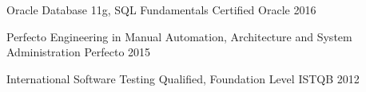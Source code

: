 

\begin{cvhonors}

  \cvhonor
    {Oracle Database 11g, SQL Fundamentals Certified} %
    {Oracle} %
    {} %
    {2016} %

  \cvhonor
    {Perfecto Engineering in Manual Automation, Architecture and System Administration} %
    {Perfecto} %
    {} %
    {2015} %

  \cvhonor
    {International Software Testing Qualified, Foundation Level} %
    {ISTQB} %
    {} %
    {2012} %

\end{cvhonors}
